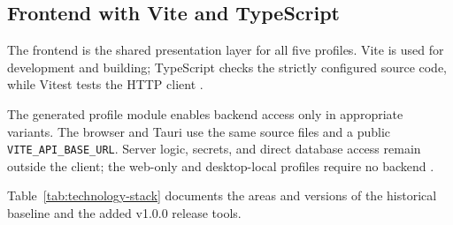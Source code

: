 \subsection{Frontend with Vite and TypeScript}
\label{subsec:frontend-vite-typescript}

The frontend is the shared presentation layer for all five profiles. Vite is
used for development and building; TypeScript checks the strictly configured
source code, while Vitest tests the HTTP client
\parencite{vite2026guide,typescript2026handbook}.

The generated profile module enables backend access only in appropriate
variants. The browser and Tauri use the same source files and a public
\texttt{VITE\_API\_BASE\_URL}. Server logic, secrets, and direct database access
remain outside the client; the web-only and desktop-local profiles require no
backend
\parencite{kleiveist2026architecture,kleiveist2026profiles}.

Table~\ref{tab:technology-stack} documents the areas and versions of the
historical baseline and the added v1.0.0 release tools.


